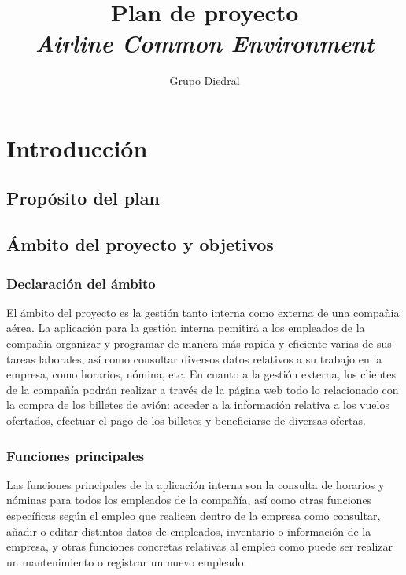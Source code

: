 \documentclass[11pt, a4paper, twoside]{report}
\title{Plan de proyecto\\\textsl{Airline Common Environment}}
\author{Grupo Diedral}
\begin{document}
	
	\tableofcontents
	\newpage

	\begin{scriptsize}
	\begin{tablacambios}
	\end{tablacambios}
	\end{scriptsize}
	\newpage

	\section{Introducción}
	\iniciarnumeraciondiedral
		\subsection{Propósito del plan}
		\subsection{Ámbito del proyecto y objetivos}
			\subsubsection{Declaración del ámbito}
			El ámbito del proyecto es la gestión tanto interna como externa de una compañia aérea. La aplicación para la gestión interna pemitirá a los empleados de la compañía organizar y programar de manera más rapida y eficiente varias de sus tareas laborales, así como consultar diversos datos relativos a su trabajo en la empresa, como horarios, nómina, etc. En cuanto a la gestión externa, los clientes de la compañía podrán realizar a través de la página web todo lo relacionado con la compra de los billetes de avión: acceder a la información relativa a los vuelos ofertados, efectuar el pago de los billetes y beneficiarse de diversas ofertas.

			\subsubsection{Funciones principales}
			Las funciones principales de la aplicación interna son la consulta de horarios y nóminas para todos los empleados de la compañía, así como otras funciones específicas según el empleo que realicen dentro de la empresa como consultar, añadir o editar distintos datos de empleados, inventario o información de la empresa, y otras funciones concretas relativas al empleo como puede ser realizar un mantenimiento o registrar un nuevo empleado. \\
\end{document}
